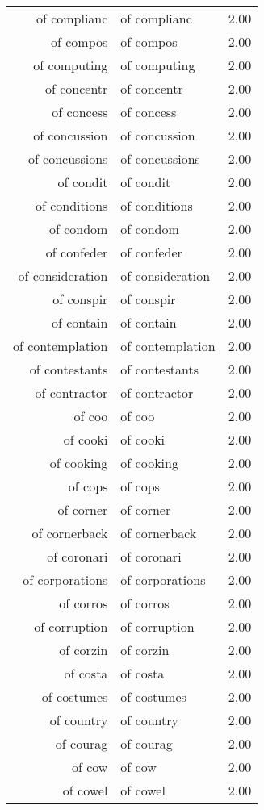 \begin{table}[ht]
\begin{tabular}{rlr}
  of complianc & of complianc & 2.00 \\ 
  of compos & of compos & 2.00 \\ 
  of computing & of computing & 2.00 \\ 
  of concentr & of concentr & 2.00 \\ 
  of concess & of concess & 2.00 \\ 
  of concussion & of concussion & 2.00 \\ 
  of concussions & of concussions & 2.00 \\ 
  of condit & of condit & 2.00 \\ 
  of conditions & of conditions & 2.00 \\ 
  of condom & of condom & 2.00 \\ 
  of confeder & of confeder & 2.00 \\ 
  of consideration & of consideration & 2.00 \\ 
  of conspir & of conspir & 2.00 \\ 
  of contain & of contain & 2.00 \\ 
  of contemplation & of contemplation & 2.00 \\ 
  of contestants & of contestants & 2.00 \\ 
  of contractor & of contractor & 2.00 \\ 
  of coo & of coo & 2.00 \\ 
  of cooki & of cooki & 2.00 \\ 
  of cooking & of cooking & 2.00 \\ 
  of cops & of cops & 2.00 \\ 
  of corner & of corner & 2.00 \\ 
  of cornerback & of cornerback & 2.00 \\ 
  of coronari & of coronari & 2.00 \\ 
  of corporations & of corporations & 2.00 \\ 
  of corros & of corros & 2.00 \\ 
  of corruption & of corruption & 2.00 \\ 
  of corzin & of corzin & 2.00 \\ 
  of costa & of costa & 2.00 \\ 
  of costumes & of costumes & 2.00 \\ 
  of country & of country & 2.00 \\ 
  of courag & of courag & 2.00 \\ 
  of cow & of cow & 2.00 \\ 
  of cowel & of cowel & 2.00 \\ 

\end{tabular}
\end{table}
